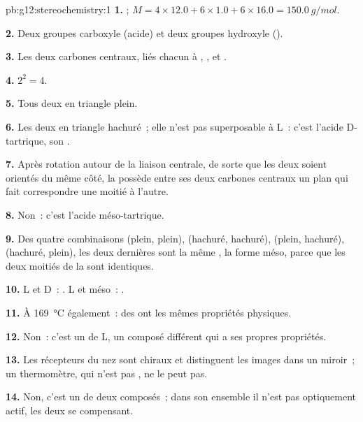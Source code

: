 \begin{solution}{pb:g12:stereochemistry:1}
\textbf{1.} ; $M = 4 \times 12.0 + 6 \times 1.0 + 6 \times 16.0
= \qty{150.0}{g/mol}$.

\textbf{2.} Deux groupes carboxyle (acide) et deux groupes hydroxyle
().

\textbf{3.} Les deux carbones centraux, liés chacun à , ,
 et .

\textbf{4.} $2^2 = 4$.

\textbf{5.} Tous deux en triangle plein.

\textbf{6.} Les deux  en triangle hachuré~; elle n'est pas
superposable à L~: c'est l'acide D-tartrique, son .

\textbf{7.} Après rotation autour de la liaison centrale, de sorte que
les deux  soient orientés du même côté, la  possède entre
ses deux carbones centraux un plan qui fait correspondre une moitié à
l'autre.

\textbf{8.} Non~: c'est l'acide méso-tartrique.

\textbf{9.} Des quatre combinaisons (plein, plein), (hachuré, hachuré),
(plein, hachuré), (hachuré, plein), les deux dernières sont la même
, la forme méso, parce que les deux moitiés de la  sont
identiques.

\textbf{10.} L et D~: . L et méso~: .

\textbf{11.} À \qty{169}{\celsius} également~: des  ont les
mêmes propriétés physiques.

\textbf{12.} Non~: c'est un  de L, un composé différent
qui a ses propres propriétés.

\textbf{13.} Les récepteurs du nez sont chiraux et distinguent les
images dans un miroir~; un thermomètre, qui n'est pas , ne le peut
pas.

\textbf{14.} Non, c'est un  de deux composés~; dans son ensemble
il n'est pas optiquement actif, les deux  se compensant.


\end{solution}
